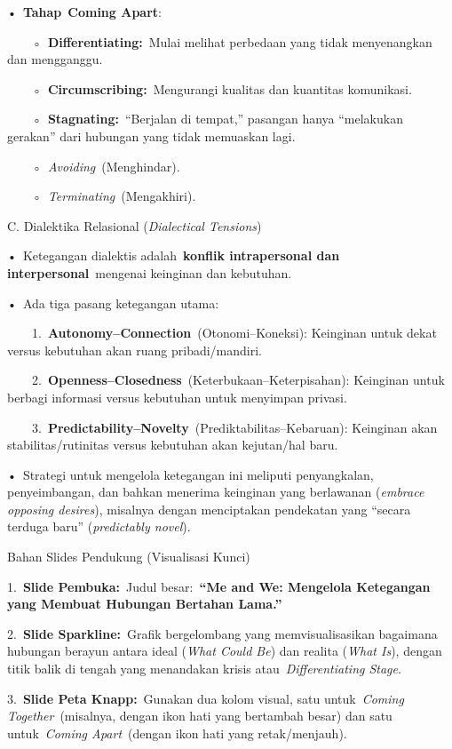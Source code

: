 \documentclass[
  letterpaper,
  DIV=11,
  numbers=noendperiod]{scrreprt}
\begin{document}
•~\textbf{Tahap}~\textbf{Coming Apart}:

~~~~◦~\textbf{Differentiating:}~Mulai melihat perbedaan yang tidak
menyenangkan dan mengganggu.

~~~~◦~\textbf{Circumscribing:}~Mengurangi kualitas dan kuantitas
komunikasi.

~~~~◦~\textbf{Stagnating:}~``Berjalan di tempat,'' pasangan hanya
``melakukan gerakan'' dari hubungan yang tidak memuaskan lagi.

~~~~◦~\emph{Avoiding}~(Menghindar).

~~~~◦~\emph{Terminating}~(Mengakhiri).

C. Dialektika Relasional (\emph{Dialectical Tensions})

•~Ketegangan dialektis adalah~\textbf{konflik intrapersonal dan
interpersonal}~mengenai keinginan dan kebutuhan.

•~Ada tiga pasang ketegangan utama:

~~~~1.~\textbf{Autonomy--Connection}~(Otonomi--Koneksi): Keinginan untuk
dekat versus kebutuhan akan ruang pribadi/mandiri.

~~~~2.~\textbf{Openness--Closedness}~(Keterbukaan--Keterpisahan):
Keinginan untuk berbagi informasi versus kebutuhan untuk menyimpan
privasi.

~~~~3.~\textbf{Predictability--Novelty}~(Prediktabilitas--Kebaruan):
Keinginan akan stabilitas/rutinitas versus kebutuhan akan kejutan/hal
baru.

•~Strategi untuk mengelola ketegangan ini meliputi penyangkalan,
penyeimbangan, dan bahkan menerima keinginan yang berlawanan
(\emph{embrace opposing desires}), misalnya dengan menciptakan
pendekatan yang ``secara terduga baru'' (\emph{predictably novel}).

Bahan Slides Pendukung (Visualisasi Kunci)

1.~\textbf{Slide Pembuka:}~Judul besar:~\textbf{``Me and We: Mengelola
Ketegangan yang Membuat Hubungan Bertahan Lama.''}

2.~\textbf{Slide Sparkline:}~Grafik bergelombang yang memvisualisasikan
bagaimana hubungan berayun antara ideal (\emph{What Could Be}) dan
realita (\emph{What Is}), dengan titik balik di tengah yang menandakan
krisis atau~\emph{Differentiating Stage}.

3.~\textbf{Slide Peta Knapp:}~Gunakan dua kolom visual, satu
untuk~\emph{Coming Together}~(misalnya, dengan ikon hati yang bertambah
besar) dan satu untuk~\emph{Coming Apart}~(dengan ikon hati yang
retak/menjauh).
\end{document}
